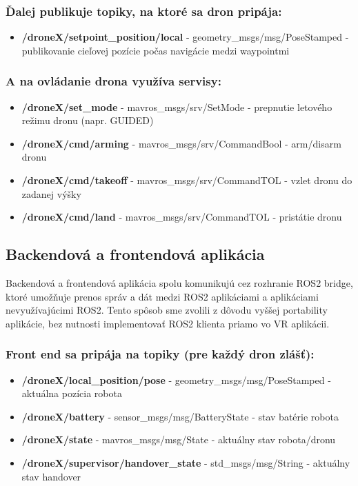\documentclass[a4paper,12pt]{article}
\begin{document}
\subsubsection*{Ďalej publikuje topiky, na ktoré sa dron pripája:}

\begin{itemize}
    \item \textbf{/droneX/setpoint\_position/local} - geometry\_msgs/msg/PoseStamped - publikovanie cieľovej pozície počas navigácie medzi waypointmi
\end{itemize}

\subsubsection*{A na ovládanie drona využíva servisy:}

\begin{itemize}
    \item \textbf{/droneX/set\_mode} - mavros\_msgs/srv/SetMode - prepnutie letového režimu dronu (napr. GUIDED)
    \item \textbf{/droneX/cmd/arming} - mavros\_msgs/srv/CommandBool - arm/disarm dronu
    \item \textbf{/droneX/cmd/takeoff} - mavros\_msgs/srv/CommandTOL - vzlet dronu do zadanej výšky
    \item \textbf{/droneX/cmd/land} - mavros\_msgs/srv/CommandTOL - pristátie dronu
\end{itemize}


\subsection{Backendová a frontendová aplikácia}

Backendová a frontendová aplikácia spolu komunikujú cez rozhranie ROS2 bridge, 
ktoré umožňuje prenos správ a dát medzi ROS2 aplikáciami a aplikáciami nevyužívajúcimi ROS2.
Tento spôsob sme zvolili z dôvodu vyššej portability aplikácie, bez nutnosti implementovať ROS2 klienta priamo vo VR aplikácii.

\subsubsection*{Front end sa pripája na topiky (pre každý dron zlášť):}

\begin{itemize}
    \item \textbf{/droneX/local\_position/pose} - geometry\_msgs/msg/PoseStamped - aktuálna pozícia robota
    \item \textbf{/droneX/battery} - sensor\_msgs/msg/BatteryState - stav batérie robota
    \item \textbf{/droneX/state} - mavros\_msgs/msg/State - aktuálny stav robota/dronu
    \item \textbf{/droneX/supervisor/handover\_state} - std\_msgs/msg/String - aktuálny stav handover
\end{itemize}
\end{document}

